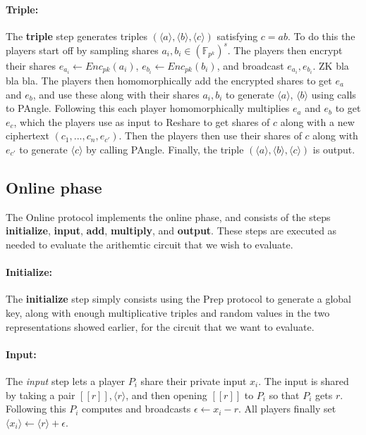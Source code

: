 \documentclass{article}
\begin{document}
\paragraph{Triple:}
The \textbf{triple} step generates triples $(\langle a \rangle, \langle b \rangle, \langle c \rangle)$ satisfying $c = ab$. To do this the players start off by sampling shares $a_i, b_i \in (\mathbb{F}_{p^k})^s$.
The players then encrypt their shares $e_{a_i} \leftarrow Enc_{pk}(a_i)$, $e_{b_i} \leftarrow Enc_{pk}(b_i)$, and broadcast $e_{a_i}, e_{b_i}$. ZK bla bla bla.
The players then homomorphically add the encrypted shares to get $e_a$ and $e_b$, and use these along with their shares $a_i, b_i$ to generate $\langle a \rangle$, $\langle b \rangle$ using calls to PAngle.
Following this each player homomorphically multiplies $e_a$ and $e_b$ to get $e_c$, which the players use as input to Reshare to get shares of $c$ along with a new ciphertext $(c_1, ..., c_n, e_{c'})$. Then the players then use their shares of $c$ along with $e_{c'}$ to generate $\langle c \rangle$ by calling PAngle. Finally, the triple $(\langle a \rangle, \langle b \rangle, \langle c \rangle)$ is output.


\subsection{Online phase} \label{Online}
The Online protocol implements the online phase, 
and consists of the steps \textbf{initialize}, \textbf{input}, \textbf{add}, \textbf{multiply}, and \textbf{output}. These steps are executed as needed to evaluate the arithemtic circuit that we wish to evaluate.

\paragraph{Initialize:} The \textbf{initialize} step simply consists using the Prep protocol to generate a global key, along with enough multiplicative triples and random values in the two representations showed earlier, for the circuit that we want to evaluate.

\paragraph{Input:} The \textit{input} step lets a player $P_i$ share their private input $x_i$. The input is shared by taking a pair $[\![ r ]\!], \langle r \rangle$, and then opening $[\![ r ]\!]$ to $P_i$ so that $P_i$ gets $r$. Following this $P_i$ computes and broadcasts $\epsilon \leftarrow x_i - r$. All players finally set $\langle x_i \rangle \leftarrow \langle r \rangle + \epsilon$. %
\end{document}
